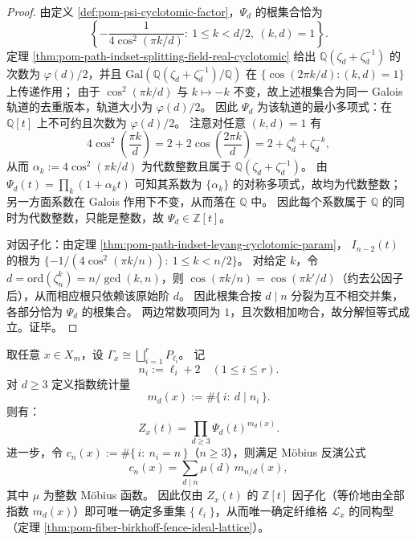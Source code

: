 \begin{proof}
由定义 \ref{def:pom-psi-cyclotomic-factor}，\(\Psi_d\) 的根集合恰为
\[
\left\{-\frac{1}{4\cos^2(\pi k/d)}:\ 1\le k<d/2,\ (k,d)=1\right\}.
\]
定理 \ref{thm:pom-path-indset-splitting-field-real-cyclotomic} 给出
\(\mathbb Q(\zeta_d+\zeta_d^{-1})\) 的次数为 \(\varphi(d)/2\)，并且
\(\mathrm{Gal}(\mathbb Q(\zeta_d+\zeta_d^{-1})/\mathbb Q)\) 在
\(\{\cos(2\pi k/d):(k,d)=1\}\) 上传递作用；
由于 \(\cos^2(\pi k/d)\) 与 \(k\mapsto -k\) 不变，故上述根集合为同一 Galois 轨道的去重版本，轨道大小为 \(\varphi(d)/2\)。
因此 \(\Psi_d\) 为该轨道的最小多项式：在 \(\mathbb Q[t]\) 上不可约且次数为 \(\varphi(d)/2\)。
注意对任意 \((k,d)=1\) 有
\[
4\cos^2\!\left(\frac{\pi k}{d}\right)
=2+2\cos\!\left(\frac{2\pi k}{d}\right)
=2+\zeta_d^k+\zeta_d^{-k},
\]
从而 \(\alpha_k:=4\cos^2(\pi k/d)\) 为代数整数且属于 \(\mathbb Q(\zeta_d+\zeta_d^{-1})\)。
由 \(\Psi_d(t)=\prod_k(1+\alpha_k t)\) 可知其系数为 \(\{\alpha_k\}\) 的对称多项式，故均为代数整数；
另一方面系数在 Galois 作用下不变，从而落在 \(\mathbb Q\) 中。
因此每个系数属于 \(\mathbb Q\) 的同时为代数整数，只能是整数，故 \(\Psi_d\in\mathbb Z[t]\)。

对因子化：由定理 \ref{thm:pom-path-indset-leyang-cyclotomic-param}，
\(I_{n-2}(t)\) 的根为 \(\{-1/(4\cos^2(\pi k/n)):\ 1\le k<n/2\}\)。
对给定 \(k\)，令 \(d=\mathrm{ord}(\zeta_n^k)=n/\gcd(k,n)\)，则
\(\cos(\pi k/n)=\cos(\pi k'/d)\)（约去公因子后），从而相应根只依赖该原始阶 \(d\)。
因此根集合按 \(d\mid n\) 分裂为互不相交并集，各部分恰为 \(\Psi_d\) 的根集合。
两边常数项同为 \(1\)，且次数相加吻合，故分解恒等式成立。证毕。
\end{proof}

\begin{theorem}\label{thm:pom-fiber-psi-exponent-mobius-reconstruct}
取任意 \(x\in X_m\)，设 \(\Gamma_x\cong\bigsqcup_{i=1}^r P_{\ell_i}\)。
记
\[
n_i:=\ell_i+2\quad(1\le i\le r).
\]
对 \(d\ge 3\) 定义指数统计量
\[
m_d(x):=\#\{\,i:\ d\mid n_i\,\}.
\]
则有：
\[
Z_x(t)=\prod_{d\ge 3}\Psi_d(t)^{m_d(x)}.
\]
进一步，令
\(
c_n(x):=\#\{\,i:\ n_i=n\,\}
\)（\(n\ge 3\)），则满足 Möbius 反演公式
\[
c_n(x)=\sum_{d\mid n}\mu(d)\,m_{n/d}(x),
\]
其中 \(\mu\) 为整数 Möbius 函数。
因此仅由 \(Z_x(t)\) 的 \(\mathbb Z[t]\) 因子化（等价地由全部指数 \(m_d(x)\)）即可唯一确定多重集 \(\{\ell_i\}\)，从而唯一确定纤维格 \(\mathcal L_x\) 的同构型（定理 \ref{thm:pom-fiber-birkhoff-fence-ideal-lattice}）。
\end{theorem}

